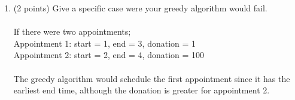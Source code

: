 \documentclass[12pt]{article}
\begin{document}
\begin{enumerate}
\begin{enumerate}
    \item \label{2a} (2 points) Give a specific case were your greedy algorithm would fail.
\\
\\ If there were two appointments; \\
\hspace*{10mm} Appointment 1: start = 1, end = 3, donation = 1 \\
\hspace*{10mm} Appointment 2: start = 2, end = 4, donation = 100 \\
\\ The greedy algorithm would schedule the first appointment since it has the earliest end time, although the donation is greater for appointment 2. 


\end{enumerate}
\end{enumerate}
\end{document}

